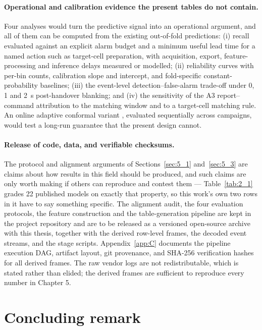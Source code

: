 \paragraph{Operational and calibration evidence the present tables do not contain.} Four analyses would turn the predictive signal into an operational argument, and all of them can be computed from the existing out-of-fold predictions: (i) recall evaluated against an explicit alarm budget and a minimum useful lead time for a named action such as target-cell preparation, with acquisition, export, feature-processing and inference delays measured or modelled; (ii) reliability curves with per-bin counts, calibration slope and intercept, and fold-specific constant-probability baselines; (iii) the event-level detection--false-alarm trade-off under 0, 1 and 2~s post-handover blanking; and (iv) the sensitivity of the A3 report--command attribution to the matching window and to a target-cell matching rule. An online adaptive conformal variant \cite{ref53}, evaluated sequentially across campaigns, would test a long-run guarantee that the present design cannot.

\paragraph{Release of code, data, and verifiable checksums.} The protocol and alignment arguments of Sections~\ref{sec:5_1} and~\ref{sec:5_3} are claims about how results in this field should be produced, and such claims are only worth making if others can reproduce and contest them --- Table~\ref{tab:2_1} grades 22 published models on exactly that property, so this work's own two rows in it have to say something specific. The alignment audit, the four evaluation protocols, the feature construction and the table-generation pipeline are kept in the project repository and are to be released as a versioned open-source archive with this thesis, together with the derived row-level frames, the decoded event streams, and the stage scripts. Appendix~\ref{app:C} documents the pipeline execution DAG, artifact layout, git provenance, and SHA-256 verification hashes for all derived frames. The raw vendor logs are not redistributable, which is stated rather than elided; the derived frames are sufficient to reproduce every number in Chapter 5.


\section{Concluding remark}
\label{sec:7_4}

